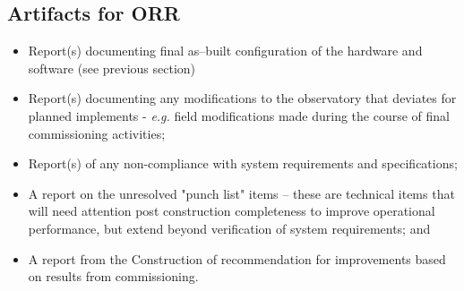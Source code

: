 \begin{itemize}
\subsection{Artifacts for ORR}

\begin{itemize}

	\item Report(s) documenting final as--built configuration of the hardware and software (see previous section)
	\item Report(s) documenting any modifications to the observatory that deviates for planned implements - {\it e.g.} field modifications made during the course of final commissioning activities;
	\item Report(s) of any non-compliance with system requirements and specifications;
	\item A report on the unresolved "punch list" items -- these are technical items that will need attention post construction completeness to improve operational performance, but extend beyond verification of system requirements; and
	\item A report from the Construction of recommendation for improvements based on results from commissioning.
\end{itemize}
	
\end{itemize}
